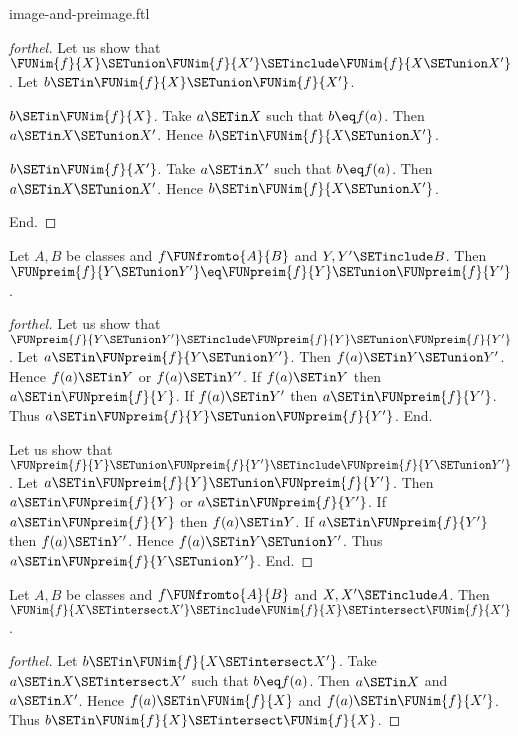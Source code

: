 \documentclass{stex}
\begin{document}
\begin{smodule}{image-and-preimage.ftl}
\begin{proof}[forthel]
  Let us show that $\FUNim{f}{X} \SETunion \FUNim{f}{X'} \SETinclude \FUNim{f}{X \SETunion X'}$.
    Let $b \SETin \FUNim{f}{X} \SETunion \FUNim{f}{X'}$.

    \begin{case}{$b \SETin \FUNim{f}{X}$.}
      Take $a \SETin X$ such that $b \eq f(a)$.
      Then $a \SETin X \SETunion X'$.
      Hence $b \SETin \FUNim{f}{X \SETunion X'}$.
    \end{case}

    \begin{case}{$b \SETin \FUNim{f}{X'}$.}
      Take $a \SETin X'$ such that $b \eq f(a)$.
      Then $a \SETin X \SETunion X'$.
      Hence $b \SETin \FUNim{f}{X \SETunion X'}$.
    \end{case}
  End.
\end{proof}

\begin{proposition}[forthel,id=FOUNDATIONS_07_1547089051910144]
  Let $A, B$ be classes and $f \FUNfromto{A}{B}$ and $Y, Y' \SETinclude B$.
  Then $\FUNpreim{f}{Y \SETunion Y'} \eq \FUNpreim{f}{Y} \SETunion \FUNpreim{f}{Y'}$.
\end{proposition}
\begin{proof}[forthel]
  Let us show that $\FUNpreim{f}{Y \SETunion Y'} \SETinclude \FUNpreim{f}{Y} \SETunion \FUNpreim{f}{Y'}$.
    Let $a \SETin \FUNpreim{f}{Y \SETunion Y'}$.
    Then $f(a) \SETin Y \SETunion Y'$.
    Hence $f(a) \SETin Y$ or $f(a) \SETin Y'$.
    If $f(a) \SETin Y$ then $a \SETin \FUNpreim{f}{Y}$.
    If $f(a) \SETin Y'$ then $a \SETin \FUNpreim{f}{Y'}$.
    Thus $a \SETin \FUNpreim{f}{Y} \SETunion \FUNpreim{f}{Y'}$.
  End.

  Let us show that $\FUNpreim{f}{Y} \SETunion \FUNpreim{f}{Y'} \SETinclude \FUNpreim{f}{Y \SETunion Y'}$.
    Let $a \SETin \FUNpreim{f}{Y} \SETunion \FUNpreim{f}{Y'}$.
    Then $a \SETin \FUNpreim{f}{Y}$ or $a \SETin \FUNpreim{f}{Y'}$.
    If $a \SETin \FUNpreim{f}{Y}$ then $f(a) \SETin Y$.
    If $a \SETin \FUNpreim{f}{Y'}$ then $f(a) \SETin Y'$.
    Hence $f(a) \SETin Y \SETunion Y'$.
    Thus $a \SETin \FUNpreim{f}{Y \SETunion Y'}$.
  End.
\end{proof}

\begin{proposition}[forthel,id=FOUNDATIONS_07_3966130473402368]
  Let $A, B$ be classes and $f \FUNfromto{A}{B}$ and $X, X' \SETinclude A$.
  Then $\FUNim{f}{X \SETintersect X'} \SETinclude \FUNim{f}{X} \SETintersect \FUNim{f}{X'}$.
\end{proposition}
\begin{proof}[forthel]
  Let $b \SETin \FUNim{f}{X \SETintersect X'}$.
  Take $a \SETin X \SETintersect X'$ such that $b \eq f(a)$.
  Then $a \SETin X$ and $a \SETin X'$.
  Hence $f(a) \SETin \FUNim{f}{X}$ and $f(a) \SETin \FUNim{f}{X'}$.
  Thus $b \SETin \FUNim{f}{X} \SETintersect \FUNim{f}{X}$.
\end{proof}


\end{smodule}
\end{document}
